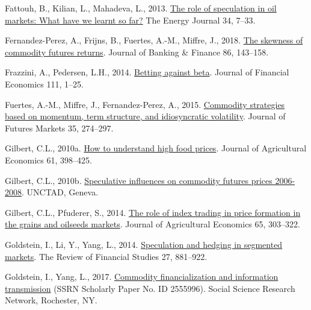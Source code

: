 \documentclass[]{elsarticle} %
\newlength{\cslhangindent}
\newlength{\cslentryspacingunit} %
\newenvironment{CSLReferences}[2] %
 {%
  \setlength{\parindent}{0pt}
  \ifodd #1
  \let\oldpar\par
  \def\par{\hangindent=\cslhangindent\oldpar}
  \fi
  \setlength{\parskip}{#2\cslentryspacingunit}
 }%
 {}
\begin{document}
\begin{CSLReferences}{1}{0}
\leavevmode{}%
Fattouh, B., Kilian, L., Mahadeva, L., 2013. \href{https://www.jstor.org/stable/41970495}{The role of speculation in oil markets: What have we learnt so far?} The Energy Journal 34, 7--33.

\leavevmode{}%
Fernandez-Perez, A., Frijns, B., Fuertes, A.-M., Miffre, J., 2018. \href{https://doi.org/10.1016/j.jbankfin.2017.06.015}{The skewness of commodity futures returns}. Journal of Banking \& Finance 86, 143--158.

\leavevmode{}%
Frazzini, A., Pedersen, L.H., 2014. \href{https://doi.org/10.1016/j.jfineco.2013.10.005}{Betting against beta}. Journal of Financial Economics 111, 1--25.

\leavevmode{}%
Fuertes, A.-M., Miffre, J., Fernandez-Perez, A., 2015. \href{https://doi.org/10.1002/fut.21656}{Commodity strategies based on momentum, term structure, and idiosyncratic volatility}. Journal of Futures Markets 35, 274--297.

\leavevmode{}%
Gilbert, C.L., 2010a. \href{https://doi.org/10.1111/j.1477-9552.2010.00248.x}{How to understand high food prices}. Journal of Agricultural Economics 61, 398--425.

\leavevmode{}%
Gilbert, C.L., 2010b. \href{https://www.cftc.gov/sites/default/files/idc/groups/public/@swaps/documents/file/plstudy_14_cifrem.pdf}{Speculative influences on commodity futures prices 2006-2008}. UNCTAD, Geneva.

\leavevmode{}%
Gilbert, C.L., Pfuderer, S., 2014. \href{https://doi.org/10.1111/1477-9552.12068}{The role of index trading in price formation in the grains and oilseeds markets}. Journal of Agricultural Economics 65, 303--322.

\leavevmode{}%
Goldstein, I., Li, Y., Yang, L., 2014. \href{https://doi.org/10.1093/rfs/hht059}{Speculation and hedging in segmented markets}. The Review of Financial Studies 27, 881--922.

\leavevmode{}%
Goldstein, I., Yang, L., 2017. \href{https://doi.org/10.2139/ssrn.2555996}{Commodity financialization and information transmission} (SSRN Scholarly Paper No. ID 2555996). Social Science Research Network, Rochester, NY.


\end{CSLReferences}
\end{document}
